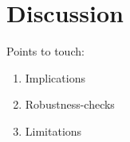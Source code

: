 \documentclass[12pt,a4paper]{article}
\begin{document}
\section{Discussion}
Points to touch: 
\begin{enumerate}
\item Implications
\item Robustness-checks
\item Limitations
\end{enumerate}
\clearpage


\setcounter{page}{\thesavepage}
\pagestyle{plain}


\end{document}
